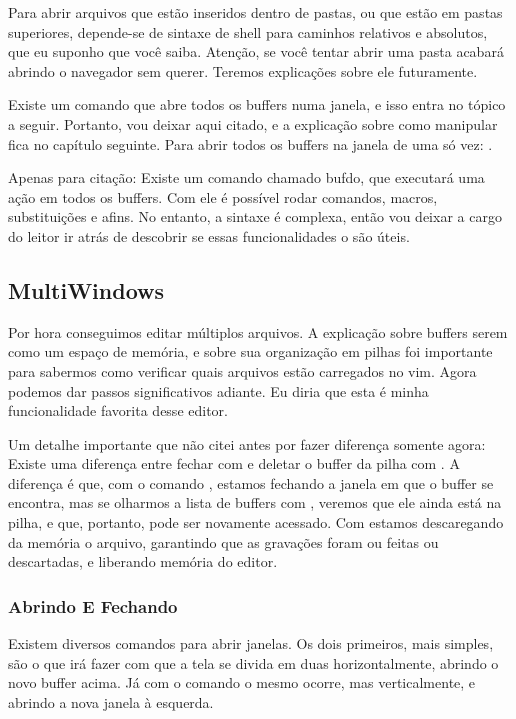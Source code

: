 Para abrir arquivos que estão inseridos dentro de pastas, ou que estão em pastas superiores,
depende-se de sintaxe de shell para caminhos relativos e absolutos, que eu suponho que você saiba.
Atenção, se você tentar abrir uma pasta acabará abrindo o navegador sem querer.
Teremos explicações sobre ele futuramente.

Existe um comando que abre todos os buffers numa janela, e isso entra no tópico a seguir.
Portanto, vou deixar aqui citado, e a explicação sobre como manipular fica no capítulo seguinte.
Para abrir todos os buffers na janela de uma só vez: .

Apenas para citação: Existe um comando chamado bufdo, que executará uma ação em todos os buffers.
Com ele é possível rodar comandos, macros, substituições e afins.
No entanto, a sintaxe é complexa, então vou deixar a cargo do leitor ir atrás de descobrir
se essas funcionalidades o são úteis.

\subsection{MultiWindows}
Por hora conseguimos editar múltiplos arquivos.
A explicação sobre buffers serem como um espaço de memória, e sobre sua organização em pilhas
foi importante para sabermos como verificar quais arquivos estão carregados no vim.
Agora podemos dar passos significativos adiante.
Eu diria que esta é minha funcionalidade favorita desse editor.

Um detalhe importante que não citei antes por fazer diferença somente agora:
Existe uma diferença entre fechar com  e deletar o buffer da pilha com .
A diferença é que, com o comando , estamos fechando a janela em que o buffer se encontra,
mas se olharmos a lista de buffers com , veremos que ele ainda está na pilha, e que,
portanto, pode ser novamente acessado.
Com  estamos descaregando da memória o arquivo, garantindo que as gravações foram ou feitas ou descartadas,
e liberando memória do editor.

\subsubsection{Abrindo E Fechando}
Existem diversos comandos para abrir janelas.
Os dois primeiros, mais simples, são o  que irá fazer com que a tela
se divida em duas horizontalmente, abrindo o novo buffer acima.
Já com o comando  o mesmo ocorre, mas verticalmente, e abrindo a nova janela à esquerda.

